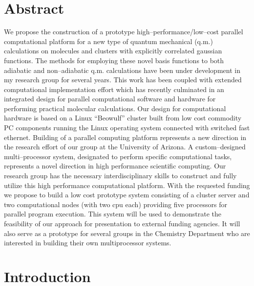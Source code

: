 \section{Abstract}
We propose the construction of a
prototype high--performance/low--cost parallel computational platform
for a new type of quantum mechanical (q.m.) calculations on molecules
and clusters with explicitly correlated gaussian functions.
The methods for employing these novel basis functions
to both adiabatic and non--adiabatic q.m. calculations have
been under development in my research group for several
years. This work has been coupled with extended computational
implementation effort which has recently culminated in an
integrated design
for parallel computational software and hardware
for performing practical molecular calculations.
Our design for 
computational hardware is based on a Linux ``Beowulf'' cluster
built
from low cost commodity PC components 
running the Linux operating system
connected with switched fast ethernet.
Building of a  parallel computing platform
represents a new direction in the research effort of our group at the
University of Arizona.
A custom--designed multi--processor system,
designated to perform specific computational tasks, 
represents a novel
direction in high performance
scientific
computing.
Our research group has the necessary interdisciplinary skills 
to
construct and fully utilize this high performance computational
platform.
With the requested funding
we propose to build a low cost prototype
system consisting of a cluster server and two 
computational nodes (with two cpu each)
providing five  
processors for parallel program execution. This system
will be used
to demonstrate the feasibility of our approach for
presentation to external funding agencies.
It will also serve as a prototype for several groups
in the Chemistry Department who are interested in
building their own multiprocessor systems.  

\newpage


\section{Introduction}

